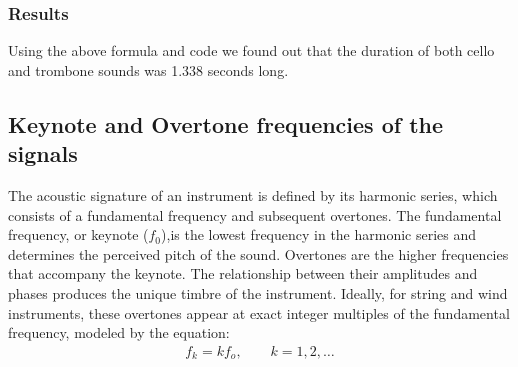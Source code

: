 \documentclass[12pt, a4paper]{article}
\begin{document}
\subsubsection{Results}
Using the above formula and code we found out that the duration of both cello and trombone sounds was 1.338 seconds long.

\subsection{Keynote and Overtone frequencies of the signals}
The acoustic signature of an instrument is defined by its harmonic series, which consists of a fundamental frequency and subsequent overtones. The fundamental frequency, or keynote ($f_0$),is the lowest frequency in the harmonic series and determines the perceived pitch of the sound. Overtones are the higher frequencies that accompany the keynote. The relationship between their amplitudes and phases produces the unique timbre of the instrument. Ideally, for string and wind instruments, these overtones appear at exact integer multiples of the fundamental frequency, modeled by the equation: 
\begin{align*}
    f_k = kf_o, \quad \quad k = 1,2,\dotsc 
\end{align*}
\end{document}
